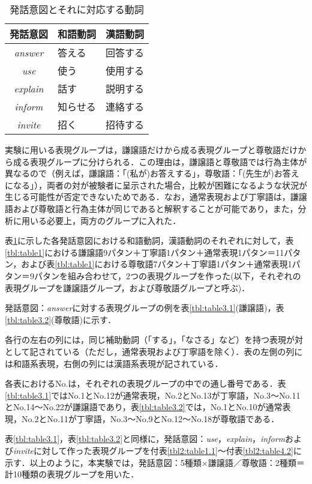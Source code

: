 \begin{table}[htbp]
\begin{center} 
\caption{発話意図とそれに対応する動詞} 
\label{tbl:table2} 
\begin{tabular}{cll} 
\hline 
発話意図 & 和語動詞 & 漢語動詞 \\
\hline 
{\it answer} & 答える & 回答する \\
{\it use} & 使う & 使用する \\
{\it explain} & 話す & 説明する \\
{\it inform} & 知らせる & 連絡する \\
{\it invite} & 招く & 招待する \\
\hline 
\end{tabular} 
\end{center} 
\end{table} 

実験に用いる表現グループは，謙譲語だけから成る表現グループと尊敬語だけから成る表現グループに分けられる．この理由は，謙譲語と尊敬語では行為主体が異なるので（例えば，謙譲語：「(私が)お答えする」，尊敬語：「(先生が)お答えになる」），両者の対が被験者に呈示された場合，比較が困難になるような状況が生じる可能性が否定できないためである．なお，通常表現および丁寧語は，謙譲語および尊敬語と行為主体が同じであると解釈することが可能であり，また，分析に用いる必要上，両方のグループに入れた．

表\ref{tbl:table2}に示した各発話意図における和語動詞，漢語動詞のそれぞれに対して，表\ref{tbl:table1}における謙譲語9パタン＋丁寧語1パタン＋通常表現1パタン＝11パタン，および表\ref{tbl:table1}における尊敬語7パタン＋丁寧語1パタン＋通常表現1パタン＝9パタンを組み合わせて，2つの表現グループを作った(以下，それぞれの表現グループを謙譲語グループ，および尊敬語グループと呼ぶ)．

発話意図：{\it answer}に対する表現グループの例を表\ref{tbl:table3.1}(謙譲語)，表\ref{tbl:table3.2}(尊敬語)に示す．

各行の左右の列には，同じ補助動詞（「する」，「なさる」など）を持つ表現が対として記されている（ただし，通常表現および丁寧語を除く）．表の左側の列には和語系表現，右側の列には漢語系表現が記されている．

各表におけるNo.は，それぞれの表現グループの中での通し番号である．表\ref{tbl:table3.1}ではNo.1とNo.12が通常表現，No.2とNo.13が丁寧語，No.3〜No.11とNo.14〜No.22が謙譲語であり，表\ref{tbl:table3.2}では，No.1とNo.10が通常表現，No.2とNo.11が丁寧語，No.3〜No.9とNo.12〜No.18が尊敬語である．

表\ref{tbl:table3.1}，表\ref{tbl:table3.2}と同様に，発話意図：{\it use}，{\it explain}，{\it inform}および{\it invite}に対して作った表現グループを付表\ref{tbl2:table1.1}〜付表\ref{tbl2:table4.2}に示す．以上のように，本実験では，発話意図：5種類×謙譲語／尊敬語：2種類＝計10種類の表現グループを用いた．


